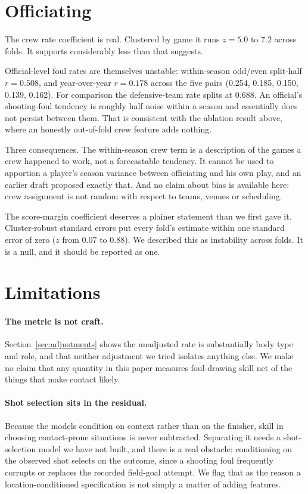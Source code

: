 \documentclass[11pt,a4paper]{article}
\begin{document}
\section{Officiating}
\label{sec:officiating}

The crew rate coefficient is real. Clustered by game it runs $z = 5.0$ to $7.2$
across folds. It supports considerably less than that suggests.

Official-level foul rates are themselves unstable: within-season odd/even
split-half $r = 0.508$, and year-over-year $r = 0.178$ across the five pairs
(0.254, 0.185, 0.150, 0.139, 0.162). For comparison the defensive-team rate
splits at $0.688$. An official's shooting-foul tendency is roughly half noise
within a season and essentially does not persist between them. That is consistent
with the ablation result above, where an honestly out-of-fold crew feature adds
nothing.

Three consequences. The within-season crew term is a description of the games a
crew happened to work, not a forecastable tendency. It cannot be used to
apportion a player's season variance between officiating and his own play, and an
earlier draft proposed exactly that. And no claim about bias is available here:
crew assignment is not random with respect to teams, venues or scheduling.

The score-margin coefficient deserves a plainer statement than we first gave it.
Cluster-robust standard errors put every fold's estimate within one standard error
of zero ($z$ from $0.07$ to $0.88$). We described this as instability across
folds. It is a null, and it should be reported as one.

\section{Limitations}
\label{sec:limitations}

\paragraph{The metric is not craft.} Section~\ref{sec:adjustments} shows the
unadjusted rate is substantially body type and role, and that neither adjustment
we tried isolates anything else. We make no claim that any quantity in this paper
measures foul-drawing skill net of the things that make contact likely.

\paragraph{Shot selection sits in the residual.} Because the models condition on
context rather than on the finisher, skill in choosing contact-prone situations is
never subtracted. Separating it needs a shot-selection model
\citep{sandholtz2020measuring} we have not built, and there is a real obstacle:
conditioning on the observed shot selects on the outcome, since a shooting foul
frequently corrupts or replaces the recorded field-goal attempt. We flag that as
the reason a location-conditioned specification is not simply a matter of adding
features.
\end{document}
